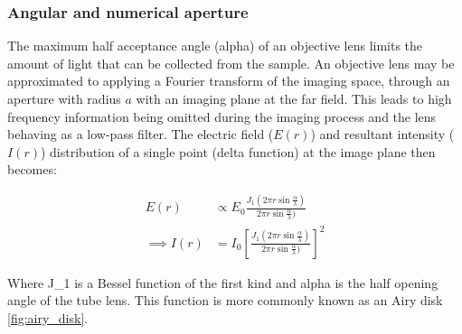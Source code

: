 \subsubsection{Angular and numerical aperture}

The maximum half acceptance angle (\gls{alpha}) of an \gls{objective lens} limits the amount of light that can be collected from the sample.
An \gls{objective lens} may be approximated to applying a Fourier transform of the imaging space, through an aperture with radius $a$ with an imaging plane at the far field.
This leads to high frequency information being omitted during the imaging process and the lens behaving as a low-pass filter.
The electric field ($E(r)$) and resultant intensity ($I(r)$) distribution of a single point (delta function) at the image plane then becomes:

\begin{align}
    E(r) &\propto E_0 \frac{J_1 \left(2\pi r \sin \frac{\alpha}{\lambda}\right)}{2\pi r \sin \frac{\alpha}{\lambda})}\label{eq:E_airy}\\
    \implies
    I(r) &= I_0 \left[\frac{J_1 \left(2\pi r \sin \frac{\alpha}{\lambda}\right)}{2\pi r \sin \frac{\alpha}{\lambda})}\right]^2\label{eq:I_airy}
\end{align}

Where \gls{J_1} is a Bessel function of the first kind and \gls{alpha} is the half opening angle of the tube lens.
This function is more commonly known as an Airy disk \ref{fig:airy_disk}.


